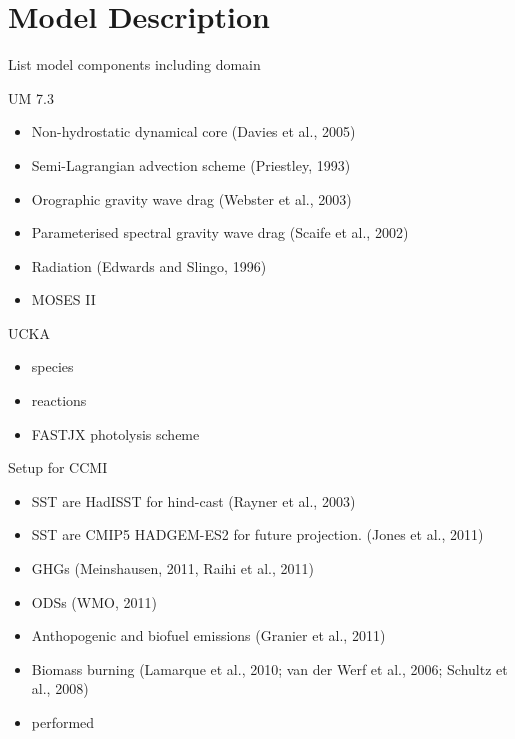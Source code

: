 \section{Model Description}

List model components including domain

UM 7.3
\begin{itemize}
\item Non-hydrostatic dynamical core (Davies et al., 2005)
\item Semi-Lagrangian advection scheme (Priestley, 1993)
\item Orographic gravity wave drag (Webster et al., 2003)
\item Parameterised spectral gravity wave drag (Scaife et al., 2002)
\item Radiation (Edwards and Slingo, 1996)
\item MOSES II
\end{itemize}
UCKA
\begin{itemize}
\item species
\item reactions
\item FASTJX photolysis scheme
\end{itemize}
Setup for CCMI
\begin{itemize}
\item SST are HadISST for hind-cast (Rayner et al., 2003)
\item SST are CMIP5 HADGEM-ES2 for future projection. (Jones et al., 2011)
\item GHGs (Meinshausen, 2011, Raihi et al., 2011)
\item ODSs (WMO, 2011)
\item Anthopogenic and biofuel emissions (Granier et al., 2011)
\item Biomass burning (Lamarque et al., 2010; van der Werf et al., 2006; Schultz et al., 2008)
\item performed
\end{itemize}



